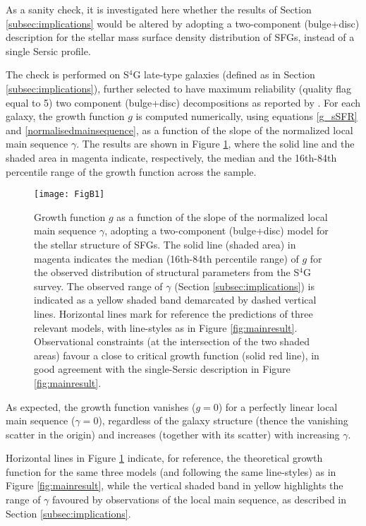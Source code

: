 \documentclass[fleqn,usenatbib]{mnras}
\begin{document}
As a sanity check, it is investigated here whether the results of Section \ref{subsec:implications} would be altered by adopting a two-component (bulge+disc) description for the stellar mass surface density distribution of SFGs, instead of a single Sersic profile.

The check is performed on S$^4$G late-type galaxies (defined as in Section \ref{subsec:implications}), further selected to have maximum reliability (quality flag equal to 5) two component (bulge+disc) decompositions as reported by \cite{Salo+15}. For each galaxy, the growth function $g$ is computed numerically, using equations \eqref{g_sSFR} and \eqref{normalisedmainsequence}, as a function of the slope of the normalized local main sequence $\gamma$. The results are shown in Figure \ref{fig:2comp}, where the solid line and the shaded area in magenta indicate, respectively, the median and the 16th-84th percentile range of the growth function across the sample.

\begin{figure}
\centering
\texttt{[image: FigB1]}
\caption{Growth function $g$ as a function of the slope of the normalized local main sequence $\gamma$, adopting a two-component (bulge+disc) model for the stellar structure of SFGs. The solid line (shaded area) in magenta indicates the median (16th-84th percentile range) of $g$ for the observed distribution of structural parameters from the S$^4$G survey. The observed range of $\gamma$ (Section \ref{subsec:implications}) is indicated as a yellow shaded band demarcated by dashed vertical lines. Horizontal lines mark for reference the predictions of three relevant models, with line-styles as in Figure \ref{fig:mainresult}. Observational constraints (at the intersection of the two shaded areas) favour a close to critical growth function (solid red line), in good agreement with the single-Sersic description in Figure \ref{fig:mainresult}.}\label{fig:2comp}
\end{figure}

As expected, the growth function vanishes ($g=0$) for a perfectly linear local main sequence ($\gamma=0$), regardless of the galaxy structure (thence the vanishing scatter in the origin) and increases (together with its scatter) with increasing $\gamma$.

Horizontal lines in Figure \ref{fig:2comp} indicate, for reference, the theoretical growth function for the same three models (and following the same line-styles) as in Figure \ref{fig:mainresult}, while the vertical shaded band in yellow highlights the range of $\gamma$ favoured by observations of the local main sequence, as described in Section \ref{subsec:implications}.
\end{document}
